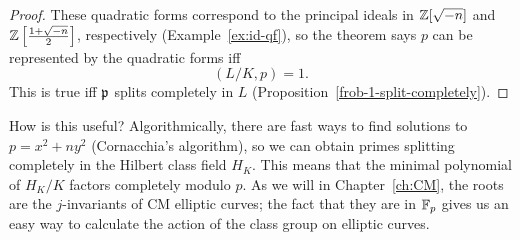 \begin{proof}
These quadratic forms correspond to the principal ideals in $\mathbb{Z}[\sqrt{-n}]$ and $\mathbb{Z}\left[ {\frac{1+\sqrt{-n}}2} \right]$, respectively (Example~\ref{ex:id-qf}), so the theorem says $p$ can be represented by the quadratic forms iff
\[
(L/K,p)=1.
\]
This is true iff $\mathfrak{p}$ splits completely in $L$ (Proposition~\ref{frob-1-split-completely}).
\end{proof}
How is this useful? Algorithmically, there are fast ways to find solutions to $p=x^2+ny^2$ (Cornacchia's algorithm), so we can obtain primes splitting completely in the Hilbert class field $H_K$. This means that the minimal polynomial of $H_K/K$ factors completely modulo $p$. As we will in Chapter~\ref{ch:CM}, the roots are the $j$-invariants of CM elliptic curves; the fact that they are in $\mathbb{F}_p$ gives us an easy way to calculate the action of the class group on elliptic curves.

